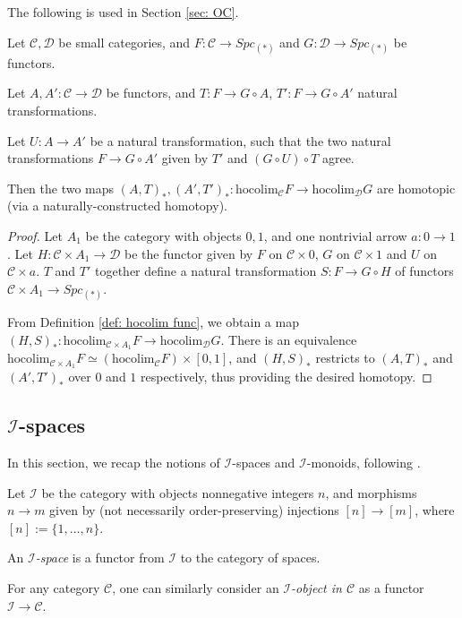 \documentclass{TPmod}
\newcommand{\hocolim}{\mathrm{hocolim}}
\newcommand{\cC}{\mathcal{C}}
\newcommand{\cD}{\mathcal{D}}
\newcommand{\cI}{\mathcal{I}}
\numberwithin{equation}{section}
\begin{document}
    The following is used in Section \ref{sec: OC}.
    \begin{lem}\label{lem: hocolim hom}
        Let $\cC, \cD$ be small categories, and $F: \cC \to Spc_{(*)}$ and $G: \cD \to Spc_{(*)}$ be functors. 

        Let $A, A': \cC \to \cD$ be functors, and $T: F \to G \circ A$, $T': F \to G \circ A'$ natural transformations.

        Let $U: A \to A'$ be a natural transformation, such that the two natural transformations $F \to G \circ A'$ given by $T'$ and $(G \circ U) \circ T$ agree.

        Then the two maps $(A,T)_*, (A',T')_*: \hocolim_\cC F \to \hocolim_\cD G$ are homotopic (via a naturally-constructed homotopy).
    \end{lem}
    
    \begin{proof}
        Let $A_1$ be the category with objects $0,1$, and one nontrivial arrow $a: 0 \to 1$. Let $H: \cC \times A_1 \to \cD$ be the functor given by $F$ on $\cC \times 0$, $G$ on $\cC \times 1$ and $U$ on $\cC \times a$. $T$ and $T'$ together define a natural transformation $S: F \to G \circ H$ of functors $\cC \times A_1 \to Spc_{(*)}$. 

        From Definition \ref{def: hocolim func}, we obtain a map $(H,S)_*: \hocolim_{\cC \times A_1} F \to \hocolim_\cD G$. There is an equivalence $\hocolim_{\cC \times A_1} F \simeq (\hocolim_\cC F) \times [0,1]$, and $(H,S)_*$ restricts to $(A,T)_*$ and $(A',T')_*$ over $0$ and $1$ respectively, thus providing the desired homotopy.
    \end{proof}




\subsection{$\cI$-spaces}
    In this section, we recap the notions of $\cI$-spaces and $\cI$-monoids, following \cite[Section 2]{Schlichtkrull}.

    Let $\cI$ be the category with objects nonnegative integers $n$, and morphisms $n \to m$ given by (not necessarily order-preserving) injections $[n] \to [m]$, where $[n] := \{1, \ldots, n\}$. 

    \begin{defn}
        An \emph{$\cI$-space} is a functor from $\cI$ to the category of spaces. 
    \end{defn}
    For any category $\cC$, one can similarly consider an \emph{$\cI$-object in $\cC$} as a functor $\cI \to \cC$.
    
\end{document}
